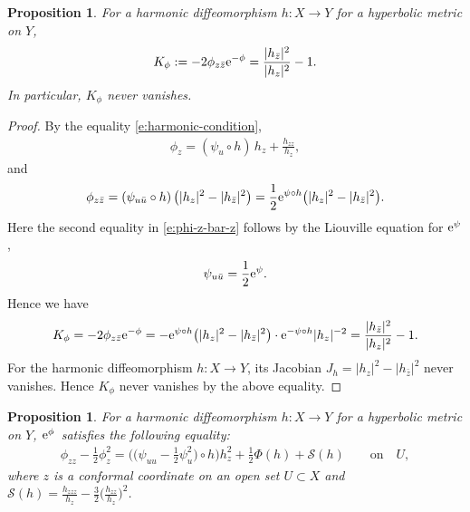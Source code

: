 \documentclass[pdftex]{sigma}%
\numberwithin{equation}{section}
\newtheorem{Proposition}[Theorem]{Proposition}
 { \theoremstyle{definition}
\newtheorem{Remark}[Theorem]{Remark} }
\begin{document}
\begin{Proposition}For a harmonic diffeomorphism $h\colon X\to Y$ for a hyperbolic metric on $Y$,
\begin{gather}\label{e:Gauss-cur}
K_{\phi}:=-2\phi_{z\bar{z}} {\rm e}^{-\phi}= \frac{|h_{\bar{z}}|^2}{|h_z|^2}-1.
\end{gather}
In particular, $K_{\phi}$ never vanishes.
\end{Proposition}

\begin{proof}By the equality \eqref{e:harmonic-condition},
\begin{gather}\label{e:phi-z}
\phi_z= (\psi_u\circ h)\,\displaystyle h_z +\frac{h_{zz}}{h_z},
\end{gather}
and
\begin{gather}\label{e:phi-z-bar-z}
\phi_{z\bar{z}}= (\psi_{u\bar{u}}\circ h)\, \big( |h_z|^2 -|h_{\bar{z}}|^2 \big) = \frac12 {\rm e}^{\psi\circ h} \big( |h_z|^2 -|h_{\bar{z}}|^2 \big).
\end{gather}
Here the second equality in \eqref{e:phi-z-bar-z} follows by the Liouville equation for ${\rm e}^{\psi}$,
\begin{gather}\label{e:liouv}
\psi_{u\bar{u}}=\frac12 {\rm e}^{\psi}.
\end{gather}
Hence we have
\begin{gather*}
K_{\phi}=-2\phi_{z\bar{z}} {\rm e}^{-\phi} = -{\rm e}^{\psi\circ h} \big( |h_z|^2 -|h_{\bar{z}}|^2 \big)\cdot {\rm e}^{-\psi\circ h} |h_z|^{-2} = \frac{|h_{\bar{z}}|^2}{|h_z|^2}-1.
\end{gather*}
For the harmonic diffeomorphism $h\colon X\to Y$, its Jacobian $J_h= |h_z|^2 - |h_{\bar{z}}|^2$ never vanishes. Hence $K_\phi$ never vanishes
by the above equality.
\end{proof}

\begin{Proposition}\label{p:energy-momentum}
For a harmonic diffeomorphism $h\colon X\to Y$ for a hyperbolic metric on $Y$,
 ${\rm e}^\phi$~satisfies the following equality:
\begin{gather*}
\phi_{zz}-\frac12 \phi_z^2 = \bigg(\bigg(\psi_{uu}-\frac12 \psi^2_u \bigg)\circ h\bigg) h_z^2+\frac12 \Phi(h) + \mathcal{S}(h) \qquad \text{on} \quad U,
\end{gather*}
 where $z$ is a conformal coordinate on an open set $U\subset X$ and $\mathcal{S}(h)= \frac{h_{zzz}}{h_z}-\frac 32 \big(\frac{h_{zz}}{h_z}\big)^2$.
\end{Proposition}
\end{document}
